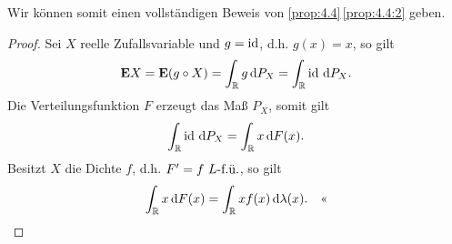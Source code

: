 Wir können somit einen vollständigen Beweis von \ref{prop:4.4}\,\ref{prop:4.4:2}
geben.
\begin{proof}
Sei $X$ reelle Zufallsvariable und $g=\id$, d.h. $g(x)=x$, so gilt
\begin{align*}
\E X = \E(g\circ X) = \int_\R g\dP_X = \int_\R \id \dP_X.
\end{align*}
Die Verteilungsfunktion $F$ erzeugt das Maß $P_X$, somit gilt
\begin{align*}
\int_\R \id \dP_X = \int_\R x\dF(x).  
\end{align*}
Besitzt $X$ die Dichte $f$, d.h. $F'=f\fu{L}$, so gilt
\begin{align*}
\int_\R x\dF(x) = \int_\R x f(x) \dlambda(x).\qedhere 
\end{align*}
\end{proof}

